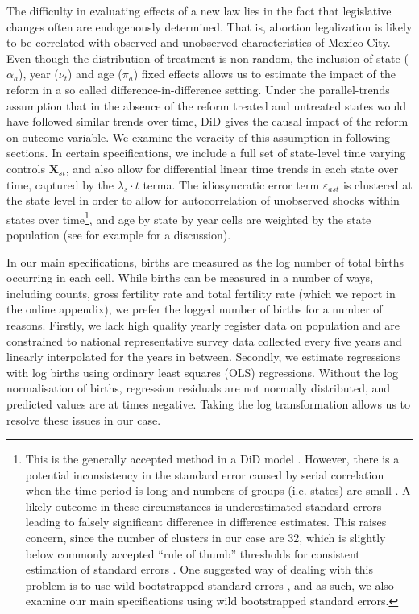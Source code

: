 \documentclass[a4paper, 11pt]{article}
\begin{document}
\begin{spacing}{2}
The difficulty in evaluating effects of a new law lies in the fact that legislative changes often are endogenously determined.  That is, abortion legalization is likely to be correlated with observed and unobserved characteristics of Mexico City.  Even though the distribution of treatment is non-random, the inclusion of state ($\alpha_a$), year ($\nu_t$) and age ($\pi_a$) fixed effects allows us to estimate the impact of the reform in a so called difference-in-difference setting.  Under the parallel-trends assumption that in the absence of the reform treated and untreated states would have followed similar trends over time, DiD gives the causal impact of the reform on outcome variable.  We examine the veracity of this assumption in following sections.  In certain specifications, we include a full set of state-level time varying controls $\bm{X}_{st}$, and also allow for differential linear time trends in each state over time, captured by the $\lambda_{s}\cdot t$ terma.  The idiosyncratic error term $\varepsilon_{ast}$ is clustered at the state level in order to allow for autocorrelation of unobserved shocks within states over time\footnote{This is the generally accepted method in a DiD model \citep{Bertrandetal2004}.  However, there is a potential inconsistency in the standard error caused by serial correlation when the time period is long and numbers of groups (i.e. states) are small \citep{Bertrandetal2004}.  A likely outcome in these circumstances is underestimated standard errors leading to falsely significant difference in difference estimates.  This raises concern, since the number of clusters in our case are 32, which is slightly below commonly accepted ``rule of thumb'' thresholds for consistent estimation of standard errors \citep{angrist_mostly_2009,CameronMiller2015}. One suggested way of dealing with this problem is to use wild bootstrapped standard errors \citep{Bertrandetal2004,CameronMiller2015}, and as such, we also examine our main specifications using wild bootstrapped standard errors.}, and age by state by year cells are weighted by the state population (see for example \citet{Dell2015} for a discussion).

In our main specifications, births are measured as the log number of total births occurring in each cell.  While births can be measured in a number of ways, including counts, gross fertility rate and total fertility rate (which we report in the online appendix), we prefer the logged number of births for a number of reasons.  Firstly, we lack high quality yearly register data on population and are constrained to national representative survey data collected every five years and linearly interpolated for the years in between.  Secondly, we estimate regressions with log births using ordinary least squares (OLS) regressions.  Without the log normalisation of births, regression residuals are not normally distributed, and predicted values are at times negative.  Taking the log transformation allows us to resolve these issues in our case.


\end{spacing}
\end{document}
